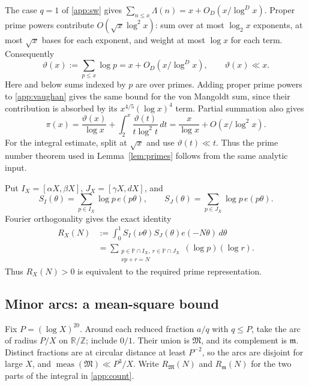 \documentclass[11pt,letterpaper]{article}
\numberwithin{equation}{section}
\theoremstyle{definition}
\theoremstyle{remark}
\DeclareMathOperator{\meas}{meas}
\newcommand{\Z}{\mathbb Z}
\newcommand{\R}{\mathbb R}
\newcommand{\Pp}{\mathbb P}
\begin{document}
The case $q=1$ of \eqref{app:sw} gives
$\sum_{n\le x}\Lambda(n)=x+O_D(x/\log^D x)$.
Proper prime powers contribute $O(\sqrt x\log^2 x)$: sum over at most
$\log_2x$ exponents, at most $\sqrt x$ bases for each exponent, and
weight at most $\log x$ for each term. Consequently
\begin{equation}\label{app:theta}
 \vartheta(x):=\sum_{p\le x}\log p
 =x+O_D(x/\log^D x),\qquad \vartheta(x)\ll x.
\end{equation}
Here and below sums indexed by $p$ are over primes. Adding proper
prime powers to \eqref{app:vaughan} gives the same bound for the
von Mangoldt sum, since their contribution is absorbed by its
$x^{4/5}(\log x)^4$ term.
Partial summation also gives
\[
 \pi(x)=\frac{\vartheta(x)}{\log x}
       +\int_2^x\frac{\vartheta(t)}{t\log^2t}\,dt
 =\frac{x}{\log x}+O(x/\log^2x).
\]
For the integral estimate, split at $\sqrt x$ and use
$\vartheta(t)\ll t$. Thus the prime number theorem used in
Lemma~\ref{lem:primes} follows from the same analytic input.

Put $I_X=[\alpha X,\beta X]$, $J_X=[\gamma X,dX]$, and
\[
 S_I(\theta)=\sum_{p\in I_X}\log p\,e(p\theta),\qquad
 S_J(\theta)=\sum_{p\in J_X}\log p\,e(p\theta).
\]
Fourier orthogonality gives the exact identity
\begin{equation}\label{app:count}
 \begin{aligned}
 R_X(N)&:=\int_0^1 S_I(\nu\theta)S_J(\theta)e(-N\theta)\,d\theta\\
 &=\sum_{\substack{p\in\Pp\cap I_X,\ r\in\Pp\cap J_X\\\nu p+r=N}}
                  (\log p)(\log r).
 \end{aligned}
\end{equation}
Thus $R_X(N)>0$ is equivalent to the required prime representation.

\subsection{Minor arcs: a mean-square bound}

Fix $P=(\log X)^{20}$. Around each reduced fraction $a/q$ with
$q\le P$, take the arc of radius $P/X$ on $\R/\Z$; include $0/1$.
Their union is $\mathfrak M$, and its complement is $\mathfrak m$.
Distinct fractions are at circular distance at least $P^{-2}$, so
the arcs are disjoint for large $X$, and
$\meas(\mathfrak M)\ll P^3/X$.
Write $R_{\mathfrak M}(N)$ and $R_{\mathfrak m}(N)$ for the two
parts of the integral in \eqref{app:count}.
\end{document}
